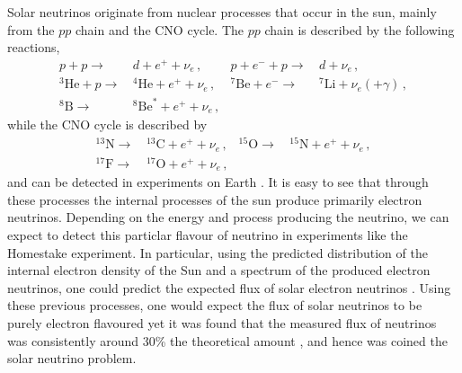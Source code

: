 Solar neutrinos originate from nuclear processes that occur in the sun, mainly from the $pp$ chain and the CNO cycle. The $pp$ chain is described by the following reactions,
\begin{align}
  p + p \to & \, d + e^{+} + \nu_{e}\, ,  &  p + e^{-} + p \to & \, d + \nu_{e}\, , \\
  ^{3}\text{He} + p \to & \, ^{4}\text{He} + e^{+} + \nu_{e}\, ,  &  ^{7}\text{Be} + e^{-} \to & \, ^{7}\text{Li} + \nu_{e}(+\gamma)\, , \\
  ^{8}\text{B} \to & \, ^{8}\text{Be}^{*} + e^{+} + \nu_{e}\, ,
\end{align}
while the CNO cycle is described by
\begin{align}
  ^{13}\text{N} \to & \, ^{13}\text{C} + e^{+} + \nu_{e} \, ,  &   ^{15}\text{O} \to &\, ^{15}\text{N} + e^{+} + \nu_{e}\, ,\\
  ^{17}\text{F} \to & \, ^{17}\text{O} + e^{+} + \nu_{e} \, , 
\end{align}
and can be detected in experiments on Earth \cite{solar_nu,pdg}. It is easy to see that through these processes the internal processes of the sun produce primarily electron neutrinos. Depending on the energy and process producing the neutrino, we can expect to detect this particlar flavour of neutrino in experiments like the Homestake experiment. In particular, using the predicted distribution of the internal electron density of the Sun and a spectrum of the produced electron neutrinos, one could predict the expected flux of solar electron neutrinos \cite{solar_nu}. Using these previous processes, one would expect the flux of solar neutrinos to be purely electron flavoured yet it was found that the measured flux of neutrinos was consistently around 30\% the theoretical amount \cite{davis, bahcall, solar_nu}, and hence was coined the solar neutrino problem.

